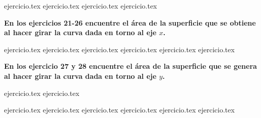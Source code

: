 \vspace{0.5cm}
\begin{enumerate}
    \setcounter{enumi}{16}
    {ejercicio.tex}
{ejercicio.tex}
{ejercicio.tex}
{ejercicio.tex}
\end{enumerate}

\vspace{0.5cm}
\noindent\textbf{En los ejercicios 21-26 encuentre el área de la superficie que se obtiene al hacer girar la curva dada en torno al eje $x$.}
\begin{enumerate}
    \setcounter{enumi}{20}
    {ejercicio.tex}
{ejercicio.tex}
{ejercicio.tex}
{ejercicio.tex}
{ejercicio.tex}
{ejercicio.tex}
\end{enumerate}

\vspace{0.5cm}
\noindent\textbf{En los ejercicio 27 y 28 encuentre el área de la superficie que se genera al hacer girar la curva dada en torno al eje $y$.}
\begin{enumerate}
    \setcounter{enumi}{26}
    {ejercicio.tex}
{ejercicio.tex}
\end{enumerate}

\vspace{0.5cm}
\begin{enumerate}
    \setcounter{enumi}{28}
    {ejercicio.tex}
{ejercicio.tex}
{ejercicio.tex}
{ejercicio.tex}
{ejercicio.tex}
{ejercicio.tex}
\end{enumerate}
